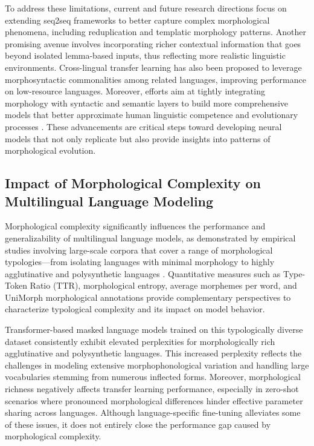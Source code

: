\documentclass[sigconf]{acmart}
\begin{document}
To address these limitations, current and future research directions focus on extending seq2seq frameworks to better capture complex morphological phenomena, including reduplication and templatic morphology patterns. Another promising avenue involves incorporating richer contextual information that goes beyond isolated lemma-based inputs, thus reflecting more realistic linguistic environments. Cross-lingual transfer learning has also been proposed to leverage morphosyntactic commonalities among related languages, improving performance on low-resource languages. Moreover, efforts aim at tightly integrating morphology with syntactic and semantic layers to build more comprehensive models that better approximate human linguistic competence and evolutionary processes \cite{ref42}. These advancements are critical steps toward developing neural models that not only replicate but also provide insights into patterns of morphological evolution.

\subsection{Impact of Morphological Complexity on Multilingual Language Modeling}

Morphological complexity significantly influences the performance and generalizability of multilingual language models, as demonstrated by empirical studies involving large-scale corpora that cover a range of morphological typologies—from isolating languages with minimal morphology to highly agglutinative and polysynthetic languages \cite{ref34}. Quantitative measures such as Type-Token Ratio (TTR), morphological entropy, average morphemes per word, and UniMorph morphological annotations provide complementary perspectives to characterize typological complexity and its impact on model behavior.

Transformer-based masked language models trained on this typologically diverse dataset consistently exhibit elevated perplexities for morphologically rich agglutinative and polysynthetic languages. This increased perplexity reflects the challenges in modeling extensive morphophonological variation and handling large vocabularies stemming from numerous inflected forms. Moreover, morphological richness negatively affects transfer learning performance, especially in zero-shot scenarios where pronounced morphological differences hinder effective parameter sharing across languages. Although language-specific fine-tuning alleviates some of these issues, it does not entirely close the performance gap caused by morphological complexity.
\end{document}
